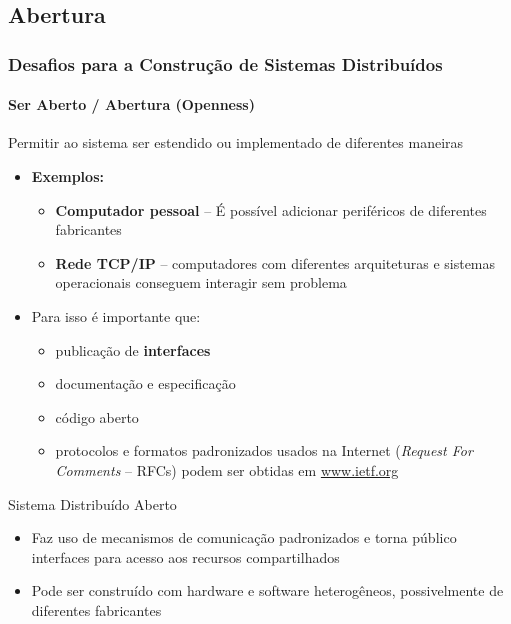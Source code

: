 \documentclass[hyperref={pdfpagelabels=false},table]{beamer}
\begin{document}
\subsection{Abertura}

\begin{frame}
    \frametitle{Desafios para a Construção de Sistemas Distribuídos}
    \framesubtitle{Ser Aberto / Abertura (Openness)}
    \vspace{-1mm}
    \begin{block}{}
	Permitir ao sistema ser estendido ou implementado de diferentes maneiras
    \end{block}
    \begin{itemize}
	\vspace{-1mm}
	\item \textbf{Exemplos:}
	\begin{itemize}
	    \item \textbf{Computador pessoal} -- É possível adicionar periféricos de diferentes fabricantes
	    \item \textbf{Rede TCP/IP} -- computadores com diferentes arquiteturas e sistemas operacionais conseguem interagir sem problema
	\end{itemize}
	\item Para isso é importante que:
	    \begin{itemize}
		\item publicação de \textbf{interfaces} \vspace{-1mm}
		\item documentação e especificação 	\vspace{-1mm}
		\item código aberto			\vspace{-1mm}
		\item protocolos e formatos padronizados usados na Internet (\textit{Request For Comments} -- RFCs) podem ser obtidas em \url{www.ietf.org}
	    \end{itemize}
	\end{itemize}

	\vspace{-2mm}
	\begin{block}{Sistema Distribuído Aberto}
	\begin{itemize}
		\item Faz uso de mecanismos de comunicação padronizados e torna público  interfaces para acesso aos recursos compartilhados \vspace{-1mm}
		\item Pode ser construído com hardware e software heterogêneos, possivelmente de diferentes fabricantes
	\end{itemize}
	\end{block}
\end{frame}
\end{document}
